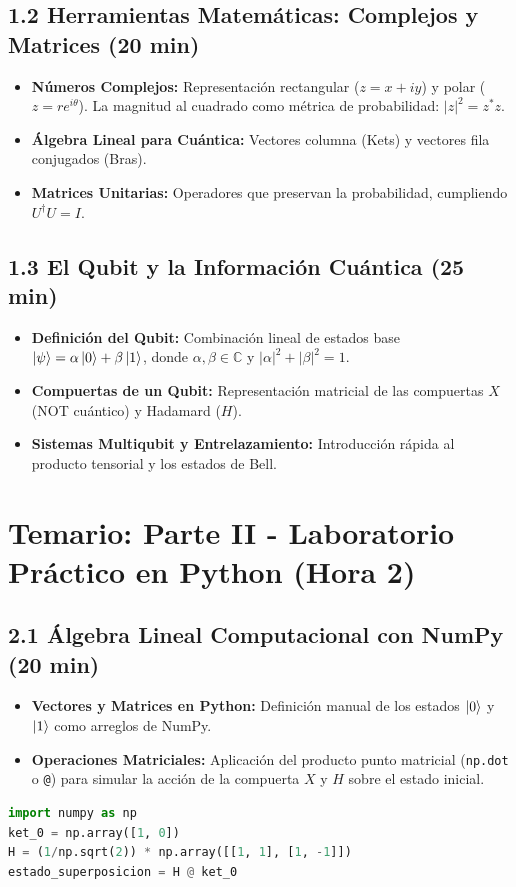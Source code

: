 \documentclass[12pt, a4paper]{article}
\begin{document}
\subsection*{1.2 Herramientas Matemáticas: Complejos y Matrices (20 min)}
\begin{itemize}
    \item \textbf{Números Complejos:} Representación rectangular ($z = x + iy$) y polar ($z = r e^{i\theta}$). La magnitud al cuadrado como métrica de probabilidad: $|z|^2 = z^* z$.
    \item \textbf{Álgebra Lineal para Cuántica:} Vectores columna (Kets) y vectores fila conjugados (Bras). 
    \item \textbf{Matrices Unitarias:} Operadores que preservan la probabilidad, cumpliendo $U^\dagger U = I$.
\end{itemize}

\subsection*{1.3 El Qubit y la Información Cuántica (25 min)}
\begin{itemize}
    \item \textbf{Definición del Qubit:} Combinación lineal de estados base $\ket{\psi} = \alpha\ket{0} + \beta\ket{1}$, donde $\alpha, \beta \in \mathbb{C}$ y $|\alpha|^2 + |\beta|^2 = 1$.
    \item \textbf{Compuertas de un Qubit:} Representación matricial de las compuertas $X$ (NOT cuántico) y Hadamard ($H$).
    \item \textbf{Sistemas Multiqubit y Entrelazamiento:} Introducción rápida al producto tensorial y los estados de Bell.
\end{itemize}

\newpage

\section*{Temario: Parte II - Laboratorio Práctico en Python (Hora 2)}

\subsection*{2.1 Álgebra Lineal Computacional con NumPy (20 min)}
\begin{itemize}
    \item \textbf{Vectores y Matrices en Python:} Definición manual de los estados $\ket{0}$ y $\ket{1}$ como arreglos de NumPy.
    \item \textbf{Operaciones Matriciales:} Aplicación del producto punto matricial (\texttt{np.dot} o \texttt{@}) para simular la acción de la compuerta $X$ y $H$ sobre el estado inicial.
\end{itemize}
\begin{lstlisting}[language=Python, caption={Ejemplo ilustrativo para el manual}]
import numpy as np
ket_0 = np.array([1, 0])
H = (1/np.sqrt(2)) * np.array([[1, 1], [1, -1]])
estado_superposicion = H @ ket_0
\end{lstlisting}
\end{document}
